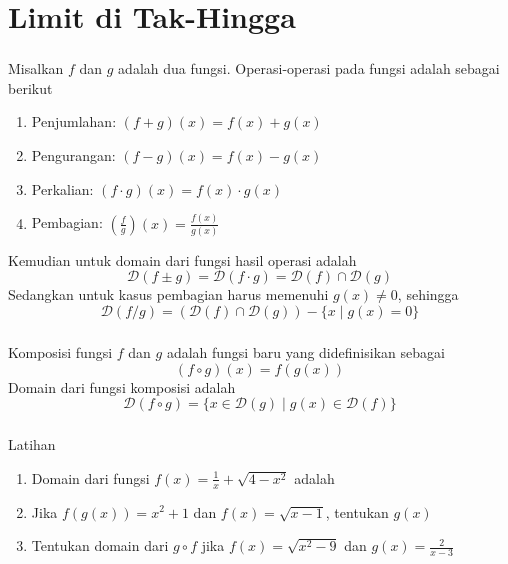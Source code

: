 \documentclass{../../kalkulus-ppt}
\newcommand{\dom}{\mathcal{D}}
\begin{document}
\section{Limit di Tak-Hingga}
\begin{frame}
    \frametitle{\insertsection}
    \begin{definisi}
        Misalkan $f$ dan $g$ adalah dua fungsi. Operasi-operasi pada fungsi adalah sebagai berikut
        \begin{enumerate}
            \item Penjumlahan: $(f+g)(x)=f(x)+g(x)$
            \item Pengurangan: $(f-g)(x)=f(x)-g(x)$
            \item Perkalian: $(f\cdot g)(x)=f(x)\cdot g(x)$
            \item Pembagian: $\left(\displaystyle\frac{f}{g}\right)(x)=\displaystyle\frac{f(x)}{g(x)}$
        \end{enumerate}
        Kemudian untuk domain dari fungsi hasil operasi adalah \[\dom(f\pm g)=\dom(f\cdot g)=\dom(f)\cap\dom(g)\]
        Sedangkan untuk kasus pembagian harus memenuhi $g(x)\ne 0$, sehingga
        \[\dom\left(f/g\right)=(\dom(f)\cap\dom(g)) - \{x\mid g(x)=0\}\]
    \end{definisi}
\end{frame}

\begin{frame}
    \frametitle{\insertsection}
    \begin{definisi}
        Komposisi fungsi $f$ dan $g$ adalah fungsi baru yang didefinisikan sebagai
        \[(f\circ g)(x)=f(g(x))\]
        Domain dari fungsi komposisi adalah
        \[\dom(f\circ g)=\{x\in\dom(g)\mid g(x)\in\dom(f)\}\]
    \end{definisi}
\end{frame}

\begin{frame}
    \frametitle{\insertsection}
    \begin{exampleblock}{Latihan}
        \begin{enumerate}
            \item Domain dari fungsi $\displaystyle f(x)=\frac{1}{x}+\sqrt{4-x^2}$ adalah
            \item Jika $f(g(x))=x^2+1$ dan $f(x)=\sqrt{x-1}$, tentukan $g(x)$
            \item Tentukan domain dari $g\circ f$ jika $f(x)=\sqrt{x^2-9}$ dan $\displaystyle g(x)=\frac{2}{x-3}$
        \end{enumerate}
    \end{exampleblock}
\end{frame}
\end{document}
